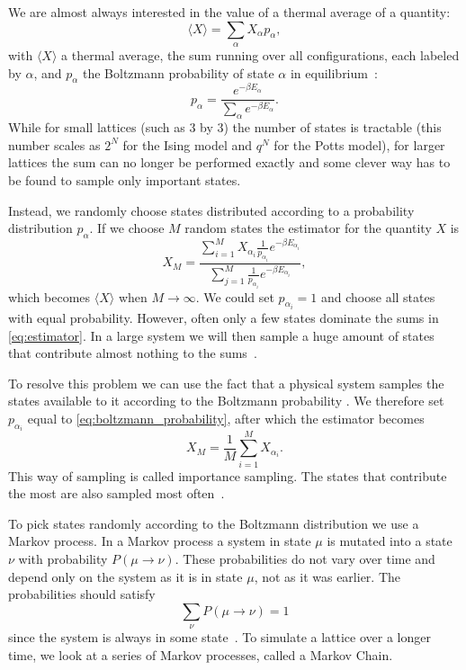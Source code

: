 \documentclass[11pt, a4paper]{report} %
\begin{document}
We are almost always interested in the value of a thermal average of a quantity:
\begin{equation}
	\langle X \rangle = \sum_{\alpha}X_{\alpha}p_{\alpha},
\end{equation}
with \(\langle X \rangle\) a thermal average, the sum running over all configurations, each labeled by \(\alpha\), and \(p_{\alpha}\) the Boltzmann probability of state \(\alpha\) in equilibrium~\cite{binney:1992}:
\begin{equation}\label{eq:boltzmann_probability}
	p_{\alpha} = \frac{e^{-\beta E_{\alpha}}}{\sum_{\alpha}e^{-\beta E_{\alpha}}}.
\end{equation}
While for small lattices (such as 3 by 3) the number of states is tractable (this number scales as \(2^{N}\) for the Ising model and \(q^{N}\) for the Potts model), for larger lattices the sum can no longer be performed exactly and some clever way has to be found to sample only important states.

Instead, we randomly choose states distributed according to a probability distribution \(p_{\alpha}\).
If we choose \(M\) random states the estimator for the quantity \(X\) is
\begin{equation}\label{eq:estimator}
	X_M = \frac{\sum_{i=1}^M X_{\alpha_i}\frac{1}{p_{\alpha_i}}e^{-\beta E_{\alpha_i}}}{\sum_{j=1}^M \frac{1}{p_{\alpha_i}} e^{-\beta E_{\alpha_i}}},
\end{equation}
which becomes \(\langle X \rangle\) when \(M \to \infty\).
We could set \(p_{\alpha_i}=1\) and choose all states with equal probability.
However, often only a few states dominate the sums in \cref{eq:estimator}.
In a large system we will then sample a huge amount of states that contribute almost nothing to the sums~\cite{newman:1999}.

To resolve this problem we can use the fact that a physical system samples the states available to it according to the Boltzmann probability .
We therefore set \(p_{\alpha_i}\) equal to \cref{eq:boltzmann_probability}, after which the estimator becomes
\begin{equation}
	X_M = \frac{1}{M} \sum_{i=1}^M X_{\alpha_i}.
\end{equation}
This way of sampling is called importance sampling. The states that contribute the most are also sampled most often~\cite{newman:1999}.

To pick states randomly according to the Boltzmann distribution we use a Markov process.
In a Markov process a system in state \(\mu\) is mutated into a state \(\nu\) with probability \(P(\mu\to\nu)\).
These probabilities do not vary over time and depend only on the system as it is in state \(\mu\), not as it was earlier.
The probabilities should satisfy
\begin{equation}
	\sum_{\nu} P(\mu \to \nu) = 1
\end{equation}
since the system is always in some state~\cite{newman:1999,landau:2015}.
To simulate a lattice over a longer time, we look at a series of Markov processes, called a Markov Chain.
\end{document}
